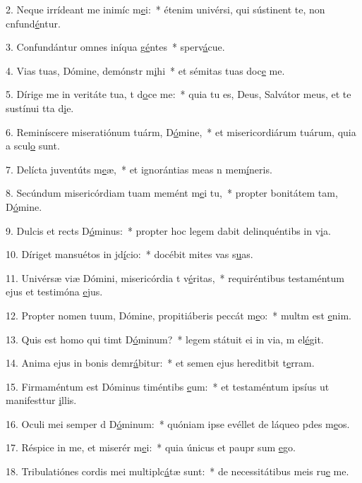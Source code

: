 2. Neque irrídeant me inimíc m\uline{e}i:~* étenim univérsi, qui sústinent te, non cnfund\uline{é}ntur.\par 
3. Confundántur omnes iníqua g\uline{é}ntes~* sperv\uline{á}cue.\par 
4. Vias tuas, Dómine, demónstr m\uline{i}hi~* et sémitas tuas doc\uline{e} me.\par 
5. Dírige me in veritáte tua, t d\uline{o}ce me:~* quia tu es, Deus, Salvátor meus, et te sustínui tta d\uline{i}e.\par 
6. Reminíscere miseratiónum tuárm, D\uline{ó}mine,~* et misericordiárum tuárum, quia a scul\uline{o} sunt.\par 
7. Delícta juventúts m\uline{e}æ,~* et ignorántias meas n mem\uline{í}neris.\par 
8. Secúndum misericórdiam tuam memént m\uline{e}i tu,~* propter bonitátem tam, D\uline{ó}mine.\par 
9. Dulcis et rects D\uline{ó}minus:~* propter hoc legem dabit delinquéntibs in v\uline{i}a.\par 
10. Díriget mansuétos in jd\uline{í}cio:~* docébit mites vas s\uline{u}as.\par 
11. Univérsæ viæ Dómini, misericórdia t v\uline{é}ritas,~* requiréntibus testaméntum ejus et testimóna \uline{e}jus.\par 
12. Propter nomen tuum, Dómine, propitiáberis peccát m\uline{e}o:~* multm est \uline{e}nim.\par 
13. Quis est homo qui timt D\uline{ó}minum?~* legem státuit ei in via, m el\uline{é}git.\par 
14. Anima ejus in bonis demr\uline{á}bitur:~* et semen ejus hereditbit t\uline{e}rram.\par 
15. Firmaméntum est Dóminus timéntibs \uline{e}um:~* et testaméntum ipsíus ut manifesttur \uline{i}llis.\par 
16. Oculi mei semper d D\uline{ó}minum:~* quóniam ipse evéllet de láqueo pdes m\uline{e}os.\par 
17. Réspice in me, et miserér m\uline{e}i:~* quia únicus et paupr sum \uline{e}go.\par 
18. Tribulatiónes cordis mei multiplc\uline{á}tæ sunt:~* de necessitátibus meis ru\uline{e} me.\par 
